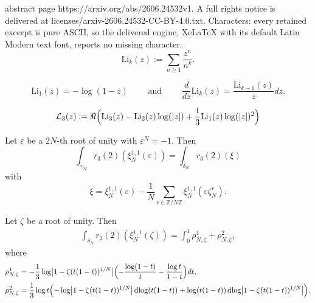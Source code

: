 \documentclass[10pt,a4paper]{amsart}
\newcommand{\Z}{\mathbb{Z}}
\newcommand{\dlog}{\operatorname{dlog}}
\newcommand{\z}{\zeta}
\begin{document}
abstract page https://arxiv.org/abs/2606.24532v1. A full rights notice is delivered at licenses/arxiv-2606.24532-CC-BY-4.0.txt. Characters: every retained excerpt is pure ASCII, so the delivered engine, XeLaTeX with its default Latin Modern text font, reports no missing character.
\begin{equation}\label{def:Lik}
    \mathrm{Li}_k(z):=\sum_{n\geq 1} \frac{z^n}{n^k}.
\end{equation}

\begin{equation}\label{polylog:deriv}
    \mathrm{Li}_1(z)=-\log(1-z) \qquad \text{ and } \qquad \frac{d}{dz} \mathrm{Li}_k(z)=\frac{\mathrm{Li}_{k-1}(z)}{z}dz.
\end{equation}

\begin{equation}\label{GonchL3}
\mathcal{L}_3(z):=\Re\Bigl(\mathrm{Li}_3(z)-\mathrm{Li}_2(z)\log(\vert z\vert)+\frac{1}{3}\mathrm{Li}_1(z)\log(\vert z\vert)^2\Bigr)
\end{equation}

\begin{lem} \label{lem:reg_xi1}
Let $\varepsilon$ be a $2N$-th root of unity with $\varepsilon^N = -1$. Then
\begin{equation*}
    \int_{\gamma_N} r_3(2)(\xi_N^{1,1}(\varepsilon)) = \int_{\delta_N} r_3(2)(\xi)
\end{equation*}
with
\begin{equation*}
    \xi = \xi_N^{1,1}(\varepsilon) - \frac{1}{N} \sum_{r \in \Z/N\Z} \xi_N^{1,1}(\varepsilon \zeta_N^r).
\end{equation*}
\end{lem}

\begin{lem} \label{lem:reg_xi2}
    Let $\zeta$ be a root of unity. Then
    \begin{align*}
        \int_{\delta_N} r_3(2)(\xi_N^{1,1}(\zeta)) = \int_0^1 \rho_{N,\z}^1 + \rho_{N,\z}^2,
    \end{align*}
    where
    \begin{align*}
        \rho_{N,\z}^1 & = - \frac13 \log \bigl|1-\zeta (t(1-t))^{1/N}\bigr| \Bigl(-\frac{\log(1-t)}{t} - \frac{\log t}{1-t}\Bigr) dt, \\
        \rho_{N,\z}^2 & = \frac13 \log t \Bigl(-\log \bigl|1-\zeta (t(1-t))^{1/N}\bigr| \dlog(t(1-t)) + \log(t(1-t)) \dlog \bigl|1-\zeta (t(1-t))^{1/N}\bigr| \Bigr).
    \end{align*}
\end{lem}
\end{document}
